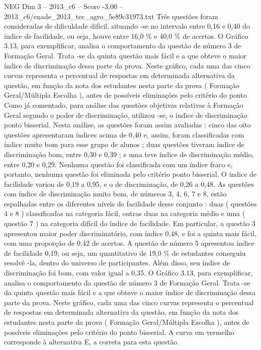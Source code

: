 \begin{textsample}{NEG Dim 3 – 2013\_c6 – Score -3.00 – 2013\_c6/enade\_2013\_tec\_agro\_5e89c31973.txt}
Três questões foram consideradas de dificuldade difícil, situando -se no intervalo entre 0,16 e 0,40 do índice de facilidade, ou seja, houve entre 16,0 \% e 40,0 \% de acertos.
O Gráfico 3.13, para exemplificar, analisa o comportamento da questão de número 3 de Formação Geral.
Trata -se da quinta questão mais fácil e a que obteve o maior índice de discriminação dessa parte da prova.
Neste gráfico, cada uma das cinco curvas representa o percentual de respostas em determinada alternativa da questão, em função da nota dos estudantes nesta parte da prova ( Formação Geral/Múltipla Escolha ), antes de possíveis eliminações pelo critério do ponto Como já comentado, para análise das questões objetivas relativas à Formação Geral segundo o poder de discriminação, utilizou -se, o índice de discriminação ponto bisserial.
Nesta análise, as questões foram assim avaliadas : cinco das oito questões apresentaram índices acima de 0,40 e, assim, foram classificadas com índice muito bom para esse grupo de alunos ; duas questões tiveram índice de discriminação bom, entre 0,30 e 0,39 ; e uma teve índice de discriminação médio, entre 0,20 e 0,29.
Nenhuma questão foi classificada com um índice fraco e, portanto, nenhuma questão foi eliminada pelo critério ponto bisserial.
O índice de facilidade variou de 0,19 a 0,95, e o de discriminação, de 0,26 a 0,48.
As questões com índice de discriminação muito bom, de números 3, 4, 6, 7 e 8, estão espalhadas entre os diferentes níveis de facilidade desse conjunto : duas ( questões 4 e 8 ) classificadas na categoria fácil, outras duas na categoria médio e uma ( questão 7 ) na categoria difícil do índice de facilidade.
Em particular, a questão 3 apresentou maior poder discriminatório, com índice 0,48, e foi a quinta mais fácil, com uma proporção de 0,42 de acertos.
A questão de número 5 apresentou índice de facilidade 0,19, ou seja, um quantitativo de 19,0 \% de estudantes conseguiu resolvê -la, dentro do universo de participantes.
Além disso, seu índice de discriminação foi bom, com valor igual a 0,35.
O Gráfico 3.13, para exemplificar, analisa o comportamento da questão de número 3 de Formação Geral.
Trata -se da quinta questão mais fácil e a que obteve o maior índice de discriminação dessa parte da prova.
Neste gráfico, cada uma das cinco curvas representa o percentual de respostas em determinada alternativa da questão, em função da nota dos estudantes nesta parte da prova ( Formação Geral/Múltipla Escolha ), antes de possíveis eliminações pelo critério do ponto bisserial.
A curva em vermelho corresponde à alternativa E, a correta para esta questão.

\end{textsample}
